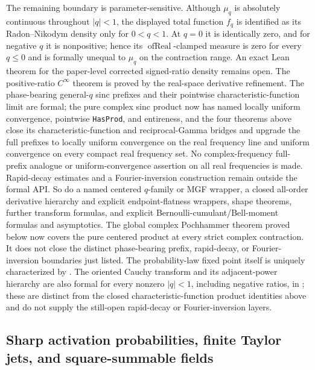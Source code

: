 \documentclass[11pt,oneside]{article}
\theoremstyle{definition}
\theoremstyle{remark}
\newcommand{\lean}[1]{%
  \ifmmode\text{\nolinkurl{#1}}\else\nolinkurl{#1}\fi}
\begin{document}
The remaining boundary is parameter-sensitive.  Although \(\mu_q\) is absolutely continuous
throughout \(|q|<1\), the displayed total function \(f_q\) is identified as its
Radon--Nikodym density only for \(0<q<1\).  At \(q=0\) it is identically zero, and for
negative \(q\) it is nonpositive; hence its \(\operatorname{ofReal}\)-clamped measure is
zero for every \(q\le0\) and is formally unequal to \(\mu_q\) on the contraction range.
An exact Lean theorem for the paper-level corrected signed-ratio density remains open.  The positive-ratio
\(C^\infty\) theorem is proved by the real-space derivative refinement.  The
phase-bearing general-\(q\) sinc prefixes and their
pointwise characteristic-function limit are formal; the pure complex sinc product now has
named locally uniform convergence, pointwise \lean{HasProd}, and entireness, and the four
theorems above close its characteristic-function and reciprocal-Gamma bridges and upgrade
the full prefixes to locally uniform convergence on the real frequency line and uniform
convergence on every compact real frequency set.  No complex-frequency full-prefix
analogue or uniform-convergence assertion on all real frequencies is made.  Rapid-decay
estimates and a Fourier-inversion construction remain outside the formal API.  So do a
named centered \(q\)-family or MGF wrapper, a closed all-order
derivative hierarchy and explicit endpoint-flatness wrappers, shape theorems, further
transform formulas, and explicit Bernoulli-cumulant/Bell-moment formulas and asymptotics.
The global complex Pochhammer theorem proved below now covers the pure centered
product at every strict complex contraction.  It does not close the distinct
phase-bearing prefix, rapid-decay, or Fourier-inversion boundaries just listed.
The probability-law fixed point itself is uniquely characterized by
.  The oriented Cauchy transform and its
adjacent-power hierarchy are also formal for every nonzero \(|q|<1\), including negative
ratios, in ; these are distinct from the closed
characteristic-function product identities above and do not supply the still-open
rapid-decay or Fourier-inversion layers.

\subsection{Sharp activation probabilities, finite Taylor jets, and square-summable fields}
\label{sec:activation-series}
\end{document}
